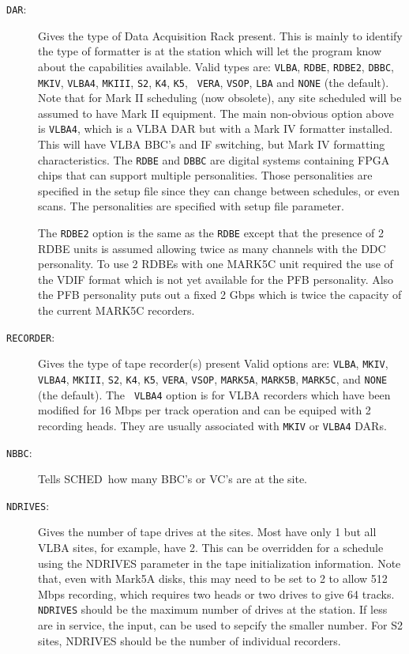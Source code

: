 \documentclass{report}
\newcommand{\schedb}{{\sc SCHED~}}
\begin{document}
\begin{description}
\item [{\tt DAR}:] Gives the type of Data Acquisition Rack present.
This is mainly to identify the type of formatter is at the station
which will let the program know about the capabilities available.
Valid types are: {\tt VLBA}, {\tt RDBE}, {\tt RDBE2}, {\tt DBBC}, {\tt
MKIV}, {\tt VLBA4}, {\tt MKIII}, {\tt S2}, {\tt K4}, {\tt K5}, {\tt
VERA}, {\tt VSOP}, {\tt LBA} and {\tt NONE} (the default).  Note that
for Mark II scheduling (now obsolete), any site scheduled will be
assumed to have Mark II equipment.  The main non-obvious option above
is {\tt VLBA4}, which is a VLBA DAR but with a Mark IV formatter
installed. This will have VLBA BBC's and IF switching, but Mark IV
formatting characteristics.  The {\tt RDBE} and {\tt DBBC} are digital
systems containing FPGA chips that can support multiple personalities.
Those personalities are specified in the setup file since they can
change between schedules, or even scans.  The personalities are
specified with  setup file parameter.

The {\tt RDBE2} option is the same as the {\tt RDBE} except that
the presence of 2 RDBE units is assumed allowing twice as many 
channels with the DDC personality.  To use 2 RDBEs with one MARK5C
unit required the use of the VDIF format which is not yet available
for the PFB personality.  Also the PFB personality puts out a fixed
2 Gbps which is twice the capacity of the current MARK5C recorders.

\item [{\tt RECORDER}:] Gives the type of tape recorder(s) present
Valid options are: {\tt VLBA}, {\tt MKIV}, {\tt VLBA4}, {\tt MKIII},
{\tt S2}, {\tt K4}, {\tt K5}, {\tt VERA}, {\tt VSOP}, {\tt MARK5A},
{\tt MARK5B}, {\tt MARK5C}, and {\tt NONE} (the default).  The {\tt
VLBA4} option is for VLBA recorders which have been modified for 16
Mbps per track operation and can be equiped with 2 recording heads.
They are usually associated with {\tt MKIV} or {\tt VLBA4} DARs.

\item[{\tt NBBC}:] Tells \schedb how many BBC's or VC's are at the
site.

\item[{\tt NDRIVES}:] Gives the number of tape drives at the sites.
Most have only 1 but all VLBA sites, for example, have 2.  This can be
overridden for a schedule using the NDRIVES parameter in the tape
initialization information.  Note that, even with Mark5A disks, this
may need to be set to 2 to allow 512 Mbps recording, which requires
two heads or two drives to give 64 tracks.  {\tt NDRIVES} should be
the maximum number of drives at the station.  If less are in service,
the  input,  can be used to sepcify the smaller number.  For
S2 sites, NDRIVES should be the number of individual recorders.


\end{description}
\end{document}
